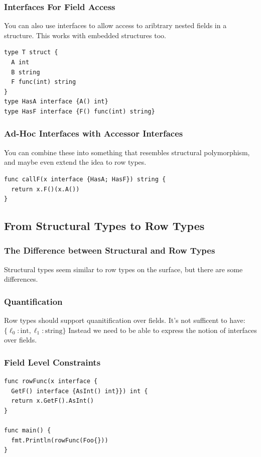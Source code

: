\documentclass{beamer}
\begin{document}
\begin{frame}[fragile]
  \frametitle{Interfaces For Field Access}
  You can also use interfaces to allow access to aribtrary nested
  fields in a structure.  This works with embedded structures too.
  \pause
\begin{lstlisting}[language=Golang]
type T struct {
  A int
  B string
  F func(int) string
}
type HasA interface {A() int}
type HasF interface {F() func(int) string}
\end{lstlisting}
\end{frame}

\begin{frame}[fragile]
  \frametitle{Ad-Hoc Interfaces with Accessor Interfaces}
  You can combine these into something that resembles structural
  polymorphism, and maybe even extend the idea to row types.
  \pause
\begin{lstlisting}[language=Golang]
func callF(x interface {HasA; HasF}) string {
  return x.F()(x.A())
}
\end{lstlisting}
\end{frame}

\subsection{From Structural Types to Row Types}

\begin{frame}
  \frametitle{The Difference between Structural and Row Types}
  Structural types seem similar to row types on the surface, but there
  are some differences.
\end{frame}

\begin{frame}
  \frametitle{Quantification}
  Row types should support quanitification over fields.  It's not sufficent to have:
  \begin{math}
    \{\ell_0 : \text{int}, \ell_1 : \text{string} \}
  \end{math}
  Instead we need to be able to express the notion of interfaces over fields.
\end{frame}

\begin{frame}[fragile]
  \frametitle{Field Level Constraints}
\begin{lstlisting}[language=Golang]
func rowFunc(x interface {
  GetF() interface {AsInt() int}}) int {
  return x.GetF().AsInt()
}

func main() {
  fmt.Println(rowFunc(Foo{}))
}
\end{lstlisting}
\end{frame}
\end{document}
